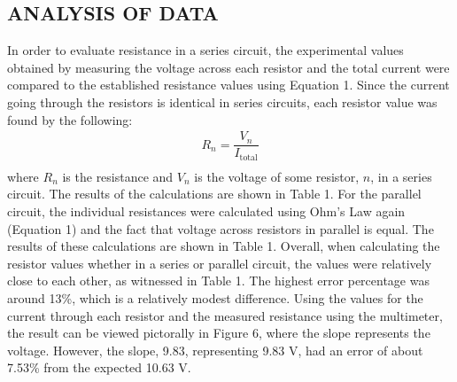 \documentclass [12pt, letterpaper, twoside] {article}
\begin{document}
\subsection* {ANALYSIS OF DATA}
In order to evaluate resistance in a series circuit, the experimental values obtained by measuring the voltage across each resistor and the total current were compared to the established resistance values using Equation 1. Since the current going through the resistors is identical in series circuits, each resistor value was found by the following:
\begin{equation*}
  \begin{split}
    R_{n} = \dfrac{V_{n}}{I_{\text{total}}} \\
  \end{split}
\end{equation*}
where \(R_{n}\) is the resistance and \(V_{n}\) is the voltage of some resistor, \(n\), in a series circuit. The results of the calculations are shown in Table 1. For the parallel circuit, the individual resistances were calculated using Ohm's Law again (Equation 1) and the fact that voltage across resistors in parallel is equal. The results of these calculations are shown in Table 1. Overall, when calculating the resistor values whether in a series or parallel circuit, the values were relatively close to each other, as witnessed in Table 1. The highest error percentage was around 13\%, which is a relatively modest difference. Using the values for the current through each resistor and the measured resistance using the multimeter, the result can be viewed pictorally in Figure 6, where the slope represents the voltage. However, the slope, 9.83, representing 9.83 V, had an error of about 7.53\% from the expected 10.63 V. %

\parallel

\begin {figure}
  \centering
  \caption {}
\end {figure}
\end{document}
